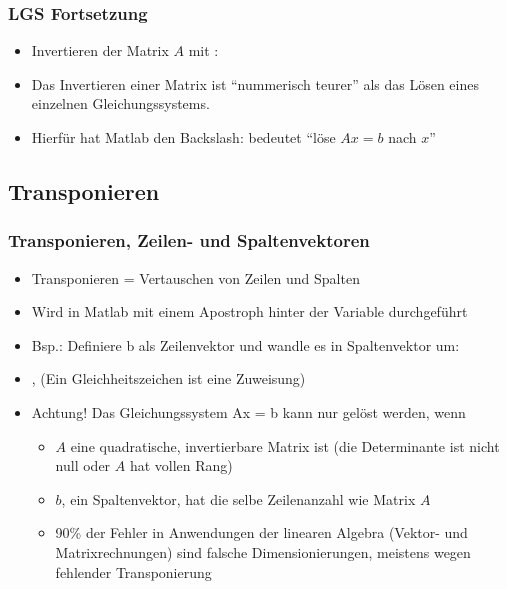     \begin{frame}
        \frametitle{LGS Fortsetzung}
        \begin{itemize}
            \item Invertieren der Matrix $A$ mit : 
            \item Das Invertieren einer Matrix ist ``nummerisch teurer'' als das Lösen eines einzelnen Gleichungssystems.
            \item Hierfür hat Matlab den Backslash:  bedeutet ``löse $Ax = b$ nach $x$''
        \end{itemize}
    \end{frame}

    \subsection{Transponieren}
    \begin{frame}
        \frametitle{Transponieren, Zeilen- und Spaltenvektoren}
        \begin{itemize}
            \item Transponieren = Vertauschen von Zeilen und Spalten
            \item Wird in Matlab mit einem Apostroph hinter der Variable durchgeführt
            \item Bsp.: Definiere b als Zeilenvektor und wandle es in Spaltenvektor um:
            \item {}, (Ein Gleichheitszeichen ist eine Zuweisung)
            \item \alert{Achtung!} Das Gleichungssystem Ax = b kann nur gelöst werden, wenn
            \begin{itemize}
                \item $A$ eine quadratische, invertierbare Matrix ist (die Determinante ist nicht null oder $A$ hat vollen Rang)
                \item $b$, ein Spaltenvektor, hat die selbe Zeilenanzahl wie Matrix $A$
                \item 90\% der Fehler in Anwendungen der linearen Algebra (Vektor- und Matrixrechnungen) sind falsche Dimensionierungen,
                meistens wegen fehlender Transponierung
            \end{itemize}
        \end{itemize}
    \end{frame}

